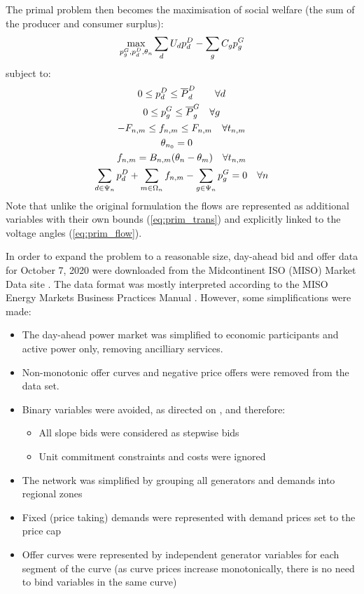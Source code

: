\documentclass[11pt,a4paper]{article}
\begin{document}
The primal problem then becomes the maximisation of social welfare (the sum of the producer and consumer surplus):
\begin{equation}
\max_{p^G_g,p^D_d,\theta_n} \sum_d U_d p^D_d - \sum_g C_g p^G_g 
\end{equation}
subject to:
\begin{gather}
0 \leq p^D_d \leq \overline{P}^D_d \quad \quad \forall d \label{eq:prim_demand} \\
0 \leq p^G_g \leq \overline{P}^G_g \quad \forall g \label{eq:prim_supply} \\
-F_{n,m}  \leq f_{n,m} \leq F_{n,m} \quad \forall t_{n,m} \label{eq:prim_trans}\\
\theta_{n_0} = 0 \quad \label{eq:prim_ref_theta} \\
f_{n,m} = B_{n,m}(\theta_n - \theta_m) \quad \forall t_{n,m} \label{eq:prim_flow} \\
\sum_{d \in \Psi_n} p^D_d + \sum_{m \in \Omega_n} f_{n,m} - \sum_{g \in \Psi_n} p^G_g = 0 \quad \forall n \label{eq:prim_balance}
\end{gather}
Note that unlike the original formulation the flows are represented as additional variables with their own bounds (\cref{eq:prim_trans}) and explicitly linked to the voltage angles (\cref{eq:prim_flow}).


In order to expand the problem to a reasonable size, day-ahead bid and offer data for October 7, 2020 were downloaded from the Midcontinent ISO (MISO) Market Data site \cite{MISOMarketData}.
The data format was mostly interpreted according to the MISO Energy Markets Business Practices Manual \cite{MISOEnergyOperating2020}. However, some simplifications were made:
\begin{itemize}
\item The day-ahead power market was simplified to economic participants and active power only, removing ancilliary services.
\item Non-monotonic offer curves and negative price offers were removed from the data set.
\item Binary variables were avoided, as directed on \cite[p. 14]{kazempourLectureMarketClearing2021}, and therefore: 
\begin{itemize}
\item All slope bids were considered as stepwise bids
\item Unit commitment constraints and costs were ignored
\end{itemize}
\item The network was simplified by grouping all generators and demands into regional zones
\item Fixed (price taking) demands were represented with demand prices set to the price cap
\item Offer curves were represented by independent generator variables for each segment of the curve (as curve prices increase monotonically, there is no need to bind variables in the same curve)
\end{itemize}
\end{document}
